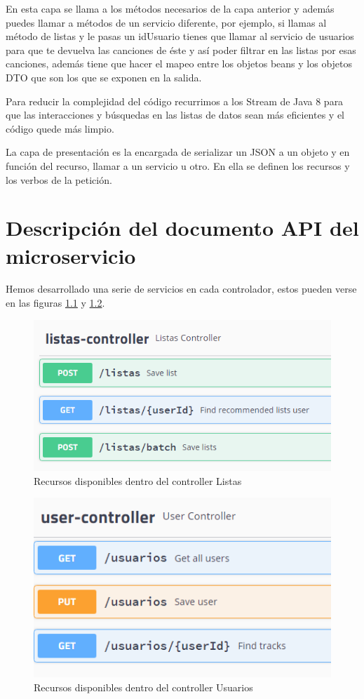 \documentclass[12pt]{report} %
\begin{document}
En esta capa se llama a los métodos necesarios de la capa anterior y además puedes llamar a métodos de un servicio diferente, por ejemplo, si llamas al método de listas y le pasas un idUsuario tienes que llamar al servicio de usuarios para que te devuelva las canciones de éste y así poder filtrar en las listas por esas canciones, además tiene que hacer el mapeo entre los objetos beans y los objetos DTO que son los que se exponen en la salida.

Para reducir la complejidad del código recurrimos a los Stream de Java 8 para que las interacciones y búsquedas en las listas de datos sean más eficientes y el código quede más limpio.

La capa de presentación es la encargada de serializar un JSON a un objeto y en función del recurso, llamar a un servicio u otro. En ella se definen los recursos y los verbos de la petición. 

\chapter{Descripción del documento API del microservicio}

Hemos desarrollado una serie de servicios en cada controlador, estos pueden verse en las figuras \ref{fig:controllerlistas} y \ref{fig:controllerusuarios}. 

\begin{figure}
	\centering
	\includegraphics[width=0.7\linewidth]{imagenes/controllerListas}
	\caption{Recursos disponibles dentro del controller Listas}
	\label{fig:controllerlistas}
\end{figure}


\begin{figure}
	\centering
	\includegraphics[width=0.7\linewidth]{imagenes/controllerUsuarios}
	\caption{Recursos disponibles dentro del controller Usuarios}
	\label{fig:controllerusuarios}
\end{figure}
\end{document}
